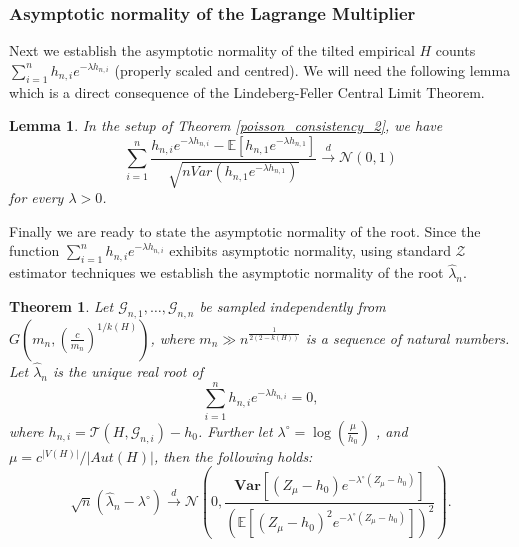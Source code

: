 \documentclass[12pt]{article}
\numberwithin{equation}{section}
\newtheorem{theorem}{Theorem}[section]
\newtheorem{lemma}{Lemma}[section]
\begin{document}
\subsubsection{Asymptotic normality of the Lagrange Multiplier}


Next we establish the asymptotic normality of the tilted empirical $H$ counts $\sum_{i=1}^n h_{n,i} e^{-\lambda h_{n,i}}$ (properly scaled and centred). We will need the following lemma which is a direct consequence of the Lindeberg-Feller Central Limit Theorem.

\begin{lemma}{\label{CLT_1}}
    In the setup of Theorem \ref{poisson_consistency_2}, we have
    \[\sum_{i=1}^n \frac{h_{n,i} e^{-\lambda h_{n,i}} - \mathbb{E}[h_{n,1} e^{-\lambda h_{n,1}}]}{\sqrt{n Var(h_{n,1} e^{-\lambda h_{n,1}})}}\xrightarrow{d} \mathcal{N}(0,1)\]
    for every \(\lambda>0\).
\end{lemma}



Finally we are ready to state the asymptotic normality of the root. Since the function $\sum_{i=1}^n h_{n,i} e^{-\lambda h_{n,i}}$ exhibits asymptotic normality, using standard $\mathcal{Z}$ estimator techniques we establish the asymptotic normality of the root $\hat{\lambda}_n$.

\begin{theorem}{\label{CLT_root}}
Let $\mathcal{G}_{n,1}, \ldots, \mathcal{G}_{n,n}$ be sampled independently from $G\left(m_n, (\frac{c}{m_n})^{1/k(H)}\right)$, where \(m_n\gg n^{\frac{1}{2(2-k(H))}}\) is a sequence of natural numbers.
Let $\hat{\lambda}_n$ is the unique real root of
\[
\sum_{i=1}^n h_{n,i} e^{-\lambda h_{n,i}} = 0,
\]
where  \(h_{n,i}=\mathcal{T}(H,\mathcal{G}_{n,i})-h_0\). Further let \(\lambda^{\circ} = \log\left(\frac{\mu}{h_0}\right)\) , and $\mu=c^{|V(H)|}/\lvert Aut(H)\rvert$,
then the following holds: 
\[\sqrt{n}(\hat{\lambda}_n - \lambda^{\circ})\xrightarrow{d}\mathcal{N}\left(0, \frac{\mathbf{Var}\left[(Z_{\mu}-h_0)e^{-\lambda^{\circ}(Z_{\mu}-h_0)}\right]}{(\mathbb{E}\left[(Z_{\mu}-h_0)^2e^{-\lambda^{\circ}(Z_{\mu}-h_0)}\right])^2}\right).
\]
\end{theorem}
\end{document}
